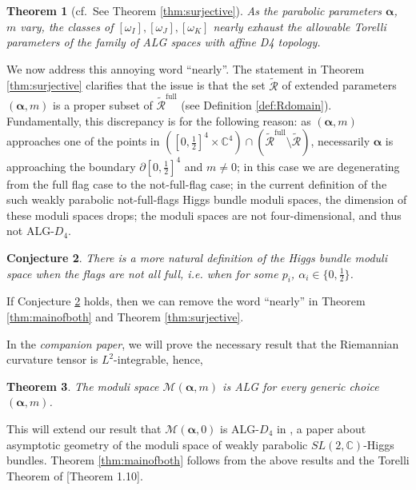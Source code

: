 \documentclass[12pt,letterpaper,reqno]{amsart}
\def\mathbf#1{#1}%
\newtheorem{thm}{Theorem}
\newtheorem{conj}[thm]{Conjecture}
\theoremstyle{remark}
\theoremstyle{definition}
\numberwithin{thm}{section}
\numberwithin{equation}{section}
\numberwithin{figure}{section}
\newcommand{\C}{\ensuremath{\mathbb C}}
\newcommand{\del}{{\partial}}
\newcommand{\bsa}{\boldsymbol{\alpha}}
\newcommand{\bfm}{\mathbf{m}}
\begin{document}
\begin{thm}[cf.\, See Theorem \ref{thm:surjective}] 
As the parabolic parameters $\boldsymbol{\alpha}$, $\mathbf{m}$ vary, the classes of $[\omega_I], [\omega_J], [\omega_K]$ nearly exhaust the allowable Torelli parameters of the family of ALG spaces with affine D4 
topology. 
\end{thm}  
We now address this annoying word ``nearly''. The statement in Theorem \ref{thm:surjective} clarifies that the issue is that the set $\widetilde{\mathcal{R}}$ of extended parameters $(\boldsymbol{\alpha}, \mathbf{m})$ is a proper subset of $\widetilde{\mathcal{R}}^{\mathrm{full}}$ (see Definition \ref{def:Rdomain}). Fundamentally, this discrepancy is for the following reason: as $(\boldsymbol{\alpha}, \mathbf{m})$ approaches one of the points in $([0,\frac{1}{2}]^4 \times \C^4) \cap (\widetilde{\mathcal{R}}^{\mathrm{full}} \setminus \widetilde{\mathcal{R}})$, necessarily $\boldsymbol{\alpha}$ is approaching the boundary $\del[0, \frac{1}{2}]^4$ and $\mathbf{m} \neq \mathbf{0}$; in this case we are degenerating from the full flag case to the not-full-flag case; in the current definition of the such weakly parabolic not-full-flags Higgs bundle moduli spaces, the dimension of these moduli spaces drops; the moduli spaces are not four-dimensional, and thus not ALG-$D_4$. 
\begin{conj}\label{conj:notfullflags} 
There is a more natural definition of the Higgs bundle moduli space when the flags are not all full, i.e. when for some $p_i$, $\alpha_i \in \{0, \frac{1}{2}\}$.
\end{conj}
If Conjecture \ref{conj:notfullflags} holds, then we can remove the word ``nearly'' in Theorem \ref{thm:mainofboth} and Theorem \ref{thm:surjective}.
\bigskip

In the \emph{companion paper}, we will prove the necessary result that the Riemannian curvature tensor is $L^2$-integrable, hence, 
\begin{thm}
The moduli space $\mathcal{M}(\bsa, \bfm)$ is ALG for every generic choice $(\bsa, \bfm)$.
\end{thm}
This will extend our result that $\mathcal{M}(\bsa, \mathbf{0})$ is ALG-$D_4$ in \cite{FMSW}, a paper about asymptotic geometry of the moduli space of weakly parabolic $SL(2,\C)$-Higgs bundles. Theorem \ref{thm:mainofboth} follows from the above results and the Torelli Theorem of \cite{CVZ2024}[Theorem 1.10].
\end{document}
